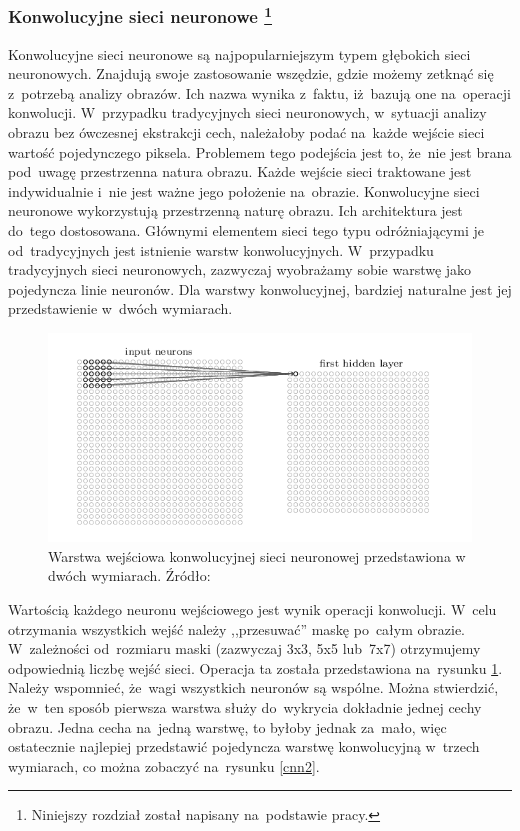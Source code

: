\subsubsection[Konwolucyjne sieci neuronowe]{Konwolucyjne sieci neuronowe \footnote{Niniejszy rozdział został napisany na~podstawie pracy\cite{nielsen}.}}
Konwolucyjne sieci neuronowe są najpopularniejszym typem głębokich sieci neuronowych. Znajdują swoje zastosowanie wszędzie, gdzie możemy zetknąć się z~potrzebą analizy obrazów. Ich nazwa wynika z~faktu, iż~bazują one na~operacji konwolucji. W~przypadku tradycyjnych sieci neuronowych, w~sytuacji analizy obrazu bez ówczesnej ekstrakcji cech, należałoby podać na~każde wejście sieci wartość pojedynczego piksela. Problemem tego podejścia jest to, że~nie jest brana pod~uwagę przestrzenna natura obrazu. Każde wejście sieci traktowane jest indywidualnie i~nie jest ważne jego położenie na~obrazie.  Konwolucyjne sieci neuronowe wykorzystują przestrzenną naturę obrazu. Ich architektura jest do~tego dostosowana. Głównymi elementem sieci tego typu odróżniającymi je od~tradycyjnych jest istnienie warstw konwolucyjnych. W~przypadku tradycyjnych sieci neuronowych, zazwyczaj wyobrażamy sobie warstwę jako pojedyncza linie neuronów. Dla warstwy konwolucyjnej, bardziej naturalne jest jej przedstawienie w~dwóch wymiarach.
\begin{figure}[ht!]
\centering
\includegraphics[scale=0.6]{res/cnn1.png}
\caption[Caption for LOF]{Warstwa wejściowa konwolucyjnej sieci neuronowej przedstawiona w dwóch wymiarach. Źródło:\cite{nielsen}\label{cnn1}} 
\end{figure}
Wartością każdego neuronu wejściowego jest wynik operacji konwolucji. W~celu otrzymania wszystkich wejść należy ,,przesuwać'' maskę po~całym obrazie. W~zależności od~rozmiaru maski (zazwyczaj 3x3, 5x5 lub~7x7) otrzymujemy odpowiednią liczbę wejść sieci. Operacja ta została przedstawiona na~rysunku \ref{cnn1}. Należy wspomnieć, że~wagi wszystkich neuronów są wspólne. Można stwierdzić, że~w~ten sposób pierwsza warstwa służy do~wykrycia dokładnie jednej cechy obrazu. Jedna cecha na~jedną warstwę, to byłoby jednak za~mało, więc ostatecznie najlepiej przedstawić pojedyncza warstwę konwolucyjną w~trzech wymiarach, co można zobaczyć na~rysunku \ref{cnn2}.
